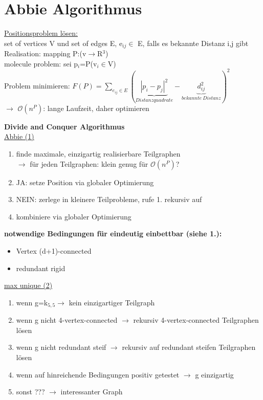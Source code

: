 \documentclass[12pt,a4paper]{article}
\begin{document}
\section{Abbie Algorithmus}

\underline{Positionsproblem lösen:}\\
set of vertices V und set of edges E, e$_{ij} \in$ E, falls es bekannte Distanz i,j gibt\\
Realisation: mapping P:(v$\rightarrow$R$^3$)\\
molecule problem: sei p$_i$=P(v$_i \in$V)\\
Problem minimieren: $F(P)=\sum \limits_{e_{ij} \in E} (\underbrace{|p_i-p_j|^2}_{Distanzquadrate}-\underbrace{d_{ij}^2}_{bekannte\ Distanz})^2$\\
$\rightarrow$ $\mathcal{O}(n^P)$: lange Laufzeit, daher optimieren

\textbf{Divide and Conquer Algorithmus}\\
\underline{Abbie (1)}
\begin{enumerate}
	\item finde maximale, einzigartig realisierbare Teilgraphen\\ $\rightarrow$ für jeden Teilgraphen: klein genug für $\mathcal{O}(n^P)$?
	\item JA: setze Position via globaler Optimierung
	\item NEIN: zerlege in kleinere Teilprobleme, rufe 1. rekursiv auf
	\item kombiniere via globaler Optimierung
\end{enumerate}

\textbf{notwendige Bedingungen für eindeutig einbettbar (siehe 1.):}
\begin{itemize}
	\item Vertex (d+1)-connected
	\item redundant rigid
\end{itemize}

\underline{max unique (2)}
\begin{enumerate}
	\item wenn g=k$_{5,5} \rightarrow$ kein einzigartiger Teilgraph
	\item wenn g nicht 4-vertex-connected $\rightarrow$ rekursiv 4-vertex-connected Teilgraphen lösen
	\item wenn g nicht redundant steif $\rightarrow$ rekursiv auf redundant steifen Teilgraphen lösen
	\item wenn auf hinreichende Bedingungen positiv getestet $\rightarrow$ g einzigartig
	\item sonst ??? $\rightarrow$ interessanter Graph
\end{enumerate}
\end{document}
